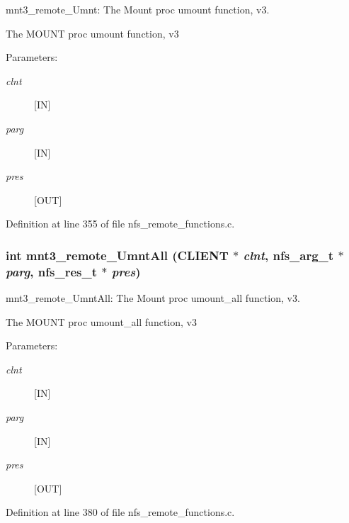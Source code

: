 mnt3\_\-remote\_\-Umnt: The Mount proc umount function, v3.

The MOUNT proc umount function, v3

\begin{Desc}
\item[Parameters:]
\begin{description}
\item[{\em clnt}][IN] \item[{\em parg}][IN] \item[{\em pres}][OUT] \end{description}
\end{Desc}


Definition at line 355 of file nfs\_\-remote\_\-functions.c.
\subsubsection{\setlength{\rightskip}{0pt plus 5cm}int mnt3\_\-remote\_\-Umnt\-All (CLIENT $\ast$ {\em clnt}, nfs\_\-arg\_\-t $\ast$ {\em parg}, nfs\_\-res\_\-t $\ast$ {\em pres})}\label{group__MNTprocs_ga10}


mnt3\_\-remote\_\-Umnt\-All: The Mount proc umount\_\-all function, v3.

The MOUNT proc umount\_\-all function, v3

\begin{Desc}
\item[Parameters:]
\begin{description}
\item[{\em clnt}][IN] \item[{\em parg}][IN] \item[{\em pres}][OUT] \end{description}
\end{Desc}


Definition at line 380 of file nfs\_\-remote\_\-functions.c.